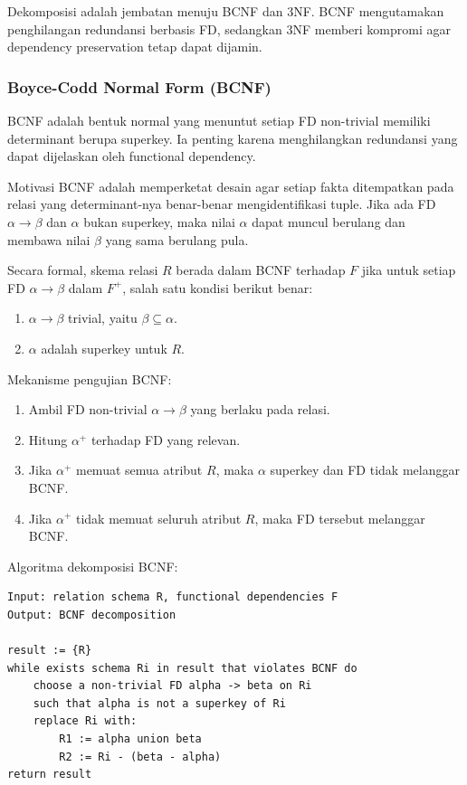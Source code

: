 Dekomposisi adalah jembatan menuju BCNF dan 3NF. BCNF mengutamakan penghilangan redundansi berbasis FD, sedangkan 3NF memberi kompromi agar dependency preservation tetap dapat dijamin.

\subsubsection{Boyce-Codd Normal Form (BCNF)}

\begin{jawab}
BCNF adalah bentuk normal yang menuntut setiap FD non-trivial memiliki determinant berupa superkey. Ia penting karena menghilangkan redundansi yang dapat dijelaskan oleh functional dependency.
\end{jawab}

Motivasi BCNF adalah memperketat desain agar setiap fakta ditempatkan pada relasi yang determinant-nya benar-benar mengidentifikasi tuple. Jika ada FD \(\alpha \rightarrow \beta\) dan \(\alpha\) bukan superkey, maka nilai \(\alpha\) dapat muncul berulang dan membawa nilai \(\beta\) yang sama berulang pula.

Secara formal, skema relasi \(R\) berada dalam BCNF terhadap \(F\) jika untuk setiap FD \(\alpha \rightarrow \beta\) dalam \(F^+\), salah satu kondisi berikut benar:
\begin{enumerate}
    \item \(\alpha \rightarrow \beta\) trivial, yaitu \(\beta \subseteq \alpha\).
    \item \(\alpha\) adalah superkey untuk \(R\).
\end{enumerate}

Mekanisme pengujian BCNF:
\begin{enumerate}
    \item Ambil FD non-trivial \(\alpha \rightarrow \beta\) yang berlaku pada relasi.
    \item Hitung \(\alpha^+\) terhadap FD yang relevan.
    \item Jika \(\alpha^+\) memuat semua atribut \(R\), maka \(\alpha\) superkey dan FD tidak melanggar BCNF.
    \item Jika \(\alpha^+\) tidak memuat seluruh atribut \(R\), maka FD tersebut melanggar BCNF.
\end{enumerate}

Algoritma dekomposisi BCNF:
\begin{lstlisting}[caption={Pseudocode dekomposisi BCNF}, label={lst:bcnf-decomposition}]
Input: relation schema R, functional dependencies F
Output: BCNF decomposition

result := {R}
while exists schema Ri in result that violates BCNF do
    choose a non-trivial FD alpha -> beta on Ri
    such that alpha is not a superkey of Ri
    replace Ri with:
        R1 := alpha union beta
        R2 := Ri - (beta - alpha)
return result
\end{lstlisting}

